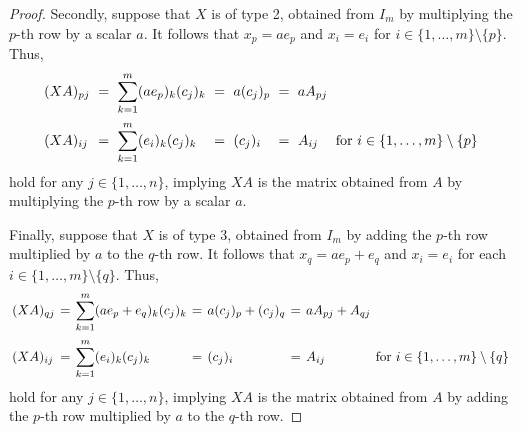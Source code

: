 \begin{proof}
  Secondly, suppose that $X$ is of type 2, obtained from $I_m$ by multiplying
  the $p$-th row by a scalar $a$.
  It follows that $x_p = ae_p$ and $x_i = e_i$ for
  $i \in \{1, \dots, m\} \setminus \{p\}$.
  Thus,
  \begin{equation*}
    \setlength\arraycolsep{3pt}
    \begin{array}{ll>{\displaystyle}llllll}
      (XA)_{pj}&=&\sum_{k=1}^m (ae_p)_k(c_j)_k&=&a(c_j)_p&=&aA_{pj}& \\[1.5em]
      (XA)_{ij}&=&\sum_{k=1}^m (e_i)_k(c_j)_k&=&(c_j)_i&=&A_{ij}&
      \text{for $i \in \{1, \dots, m\} \setminus \{p\}$}
    \end{array}
  \end{equation*}
  hold for any $j \in \{1, \dots, n\}$, implying $XA$ is the matrix obtained
  from $A$ by multiplying the $p$-th row by a scalar $a$.

  Finally, suppose that $X$ is of type 3, obtained from $I_m$ by adding the
  $p$-th row multiplied by $a$ to the $q$-th row.
  It follows that $x_q = ae_p + e_q$ and $x_i = e_i$ for each
  $i \in \{1, \dots, m\} \setminus \{q\}$.
  Thus,
  \begin{equation*}
    \setlength\arraycolsep{2pt}
    \begin{array}{ll>{\displaystyle}llllll}
      (XA)_{qj} &=& \sum_{k=1}^m (ae_p + e_q)_k(c_j)_k &=& a(c_j)_p + (c_j)_q
        &=& aA_{pj} + A_{qj} & \\[1.5em]
      (XA)_{ij} &=& \sum_{k=1}^m (e_i)_k(c_j)_k &=& (c_j)_i &=& A_{ij}
        & \text{for $i \in \{1, \dots, m\} \setminus \{q\}$}
    \end{array}
  \end{equation*}
  hold for any $j \in \{1, \dots, n\}$, implying $XA$ is the matrix obtained
  from $A$ by adding the $p$-th row multiplied by $a$ to the $q$-th row.
\end{proof}


